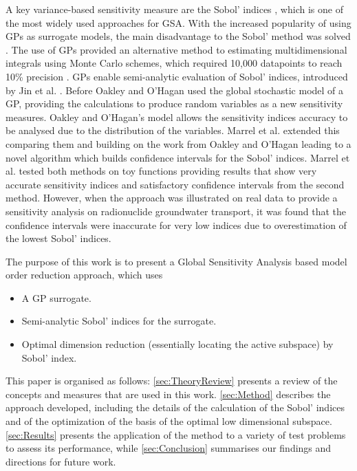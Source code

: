 \documentclass[preprint,12pt]{elsarticle}
\begin{document}
        A key variance-based sensitivity measure are the Sobol' indices \cite{Sobol2001}, which is one of the most widely used approaches for GSA. With the increased popularity of using GPs as surrogate models, the main disadvantage to the Sobol' method was solved \cite{Oakley.OHagan2004,Jin.etal2004,Marrel.etal2009}. The use of GPs provided an alternative method to estimating multidimensional integrals using Monte Carlo schemes, which required 10,000 datapoints to reach 10\% precision \cite{Lamoureux.etal2014}. GPs enable semi-analytic evaluation of Sobol' indices, introduced by Jin et al. \cite{Jin.etal2004}. Before Oakley and O'Hagan \cite{Oakley.OHagan2004} used the global stochastic model of a GP, providing the calculations to produce random variables as a new sensitivity measures. Oakley and O'Hagan's \cite{Oakley.OHagan2004} model allows the sensitivity indices accuracy to be analysed due to the distribution of the variables. Marrel et al. \cite{Marrel.etal2009} extended this comparing them and building on the work from Oakley and O'Hagan \cite{Oakley.OHagan2004} leading to a novel algorithm which builds confidence intervals for the Sobol' indices. Marrel et al. \cite{Marrel.etal2009} tested both methods on toy functions providing results that show very accurate sensitivity indices and satisfactory confidence intervals from the second method. However, when the approach was illustrated on real data to provide a sensitivity analysis on radionuclide groundwater transport, it was found that the confidence intervals were inaccurate for very low indices due to overestimation of the lowest Sobol' indices.

        The purpose of this work is to present a Global Sensitivity Analysis based model order reduction approach, which uses 
        \begin{itemize}
            \item A GP surrogate.
            \item Semi-analytic Sobol' indices for the surrogate.
            \item Optimal dimension reduction (essentially locating the active subspace) by Sobol' index.
        \end{itemize}

        This paper is organised as follows: \cref{sec:TheoryReview} presents a review of the concepts and measures that are used in this work. \cref{sec:Method} describes the approach developed, including the details of the calculation of the Sobol' indices and of the optimization of the basis of the optimal low dimensional subspace. \cref{sec:Results} presents the application of the method to a variety of test problems to assess its performance, while \cref{sec:Conclusion} summarises our findings and directions for future work. 
\end{document}
